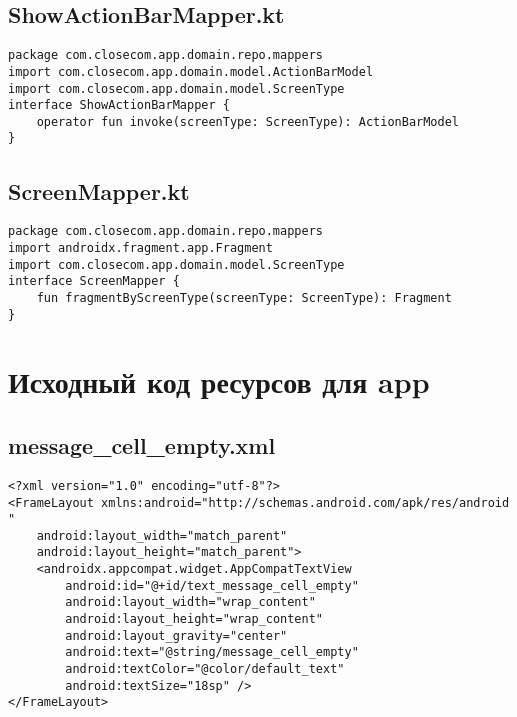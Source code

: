 \documentclass[listing]{espd}
\begin{document}
\subsection{ShowActionBarMapper.kt}
\begin{verbatim}
package com.closecom.app.domain.repo.mappers
import com.closecom.app.domain.model.ActionBarModel
import com.closecom.app.domain.model.ScreenType
interface ShowActionBarMapper {
    operator fun invoke(screenType: ScreenType): ActionBarModel
}
\end{verbatim}

\subsection{ScreenMapper.kt}
\begin{verbatim}
package com.closecom.app.domain.repo.mappers
import androidx.fragment.app.Fragment
import com.closecom.app.domain.model.ScreenType
interface ScreenMapper {
    fun fragmentByScreenType(screenType: ScreenType): Fragment
}
\end{verbatim}

\section{Исходный код ресурсов для app}

\subsection{message\_cell\_empty.xml}
\begin{verbatim}
<?xml version="1.0" encoding="utf-8"?>
<FrameLayout xmlns:android="http://schemas.android.com/apk/res/android
"
    android:layout_width="match_parent"
    android:layout_height="match_parent">
    <androidx.appcompat.widget.AppCompatTextView
        android:id="@+id/text_message_cell_empty"
        android:layout_width="wrap_content"
        android:layout_height="wrap_content"
        android:layout_gravity="center"
        android:text="@string/message_cell_empty"
        android:textColor="@color/default_text"
        android:textSize="18sp" />
</FrameLayout>
\end{verbatim}
\end{document}
